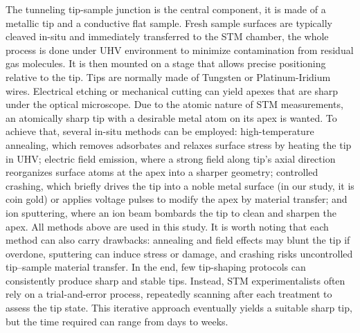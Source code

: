 The tunneling tip-sample junction is the central component, it is made of a metallic tip and a conductive flat sample. Fresh sample surfaces are typically cleaved in-situ and immediately transferred to the STM chamber, the whole process is done under \ac{UHV} environment to minimize contamination from residual gas molecules. It is then mounted on a stage that allows precise positioning relative to the tip. Tips are normally made of Tungsten or Platinum-Iridium wires. Electrical etching or mechanical cutting can yield apexes that are sharp under the optical microscope. Due to the atomic nature of \ac{STM} measurements, an atomically sharp tip with a desirable metal atom on its apex is wanted. To achieve that, several in-situ methods can be employed: high-temperature annealing, which removes adsorbates and relaxes surface stress by heating the tip in UHV; electric field emission, where a strong field along tip's axial direction reorganizes surface atoms at the apex into a sharper geometry; controlled crashing, which briefly drives the tip into a noble metal surface (in our study, it is coin gold) or applies voltage pulses to modify the apex by material transfer; and ion sputtering, where an ion beam bombards the tip to clean and sharpen the apex. All methods above are used in this study. It is worth noting that each method can also carry drawbacks: annealing and field effects may blunt the tip if overdone, sputtering can induce stress or damage, and crashing risks uncontrolled tip–sample material transfer. In the end, few tip-shaping protocols can consistently produce sharp and stable tips. Instead, STM experimentalists often rely on a trial-and-error process, repeatedly scanning after each treatment to assess the tip state. This iterative approach eventually yields a suitable sharp tip, but the time required can range from days to weeks.



